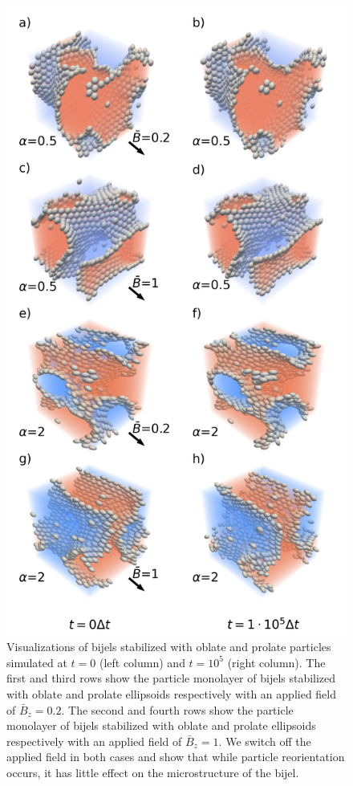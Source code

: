 \begin{figure} 
\centering 
\includegraphics[scale=0.4]{../figures/results/paper2/microstructure_viz-field_down.png} 
\caption{Visualizations of bijels stabilized with oblate and prolate particles simulated at $t = 0$ (left column) and $t = 10^5$ (right column). 
         The first and third rows show the particle monolayer of bijels stabilized with oblate and prolate ellipsoids respectively with an applied 
         field of $\bar{B}_z = 0.2$. The second and fourth rows show the particle monolayer of bijels stabilized with oblate and prolate ellipsoids 
         respectively with an applied field of $\bar{B}_z = 1$. We switch off the applied field in both cases and show that while particle reorientation 
         occurs, it has little effect on the microstructure of the bijel.}
\label{fig:microstructure_viz-field_down}
\end{figure}

